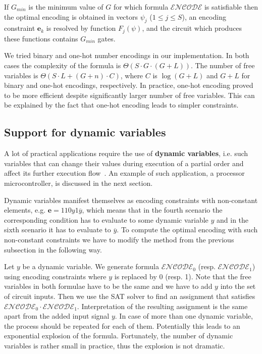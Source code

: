 If $G_{min}$ is the minimum value of $G$ for which formula $\mathcal{ENCODE}$
is satisfiable then the optimal encoding is obtained in vectors $\psi_{j}$
($1\le j\le S$), an encoding constraint $\mathbf{e}_{k}$ is resolved
by function $F_{j}(\psi)$, and the circuit which produces these functions
contains $G_{min}$ gates.

We tried binary and one-hot number encodings in our implementation.
In both cases the complexity of the formula is $\Theta(S\cdot G\cdot(G+L))$.
The number of free variables is $\Theta(S\cdot L+(G+n)\cdot C)$,
where $C$ is $\log(G+L)$ and $G+L$ for binary and one-hot encodings,
respectively. In practice, one-hot encoding proved to be more efficient
despite significantly larger number of free variables. This can be
explained by the fact that one-hot encoding leads to simpler constraints.


\subsection{Support for dynamic variables\label{sub:Support-for-dynamic}}

A lot of practical applications require the use of \textbf{dynamic
variables}, i.e. such variables that can change their values during
execution of a partial order and affect its further execution flow~\cite{2009_mokhov_phd}.
An example of such application, a processor microcontroller, is discussed
in the next section.

Dynamic variables manifest themselves as encoding constraints with
non-constant elements, e.g. $\mathbf{e}=110y1\overline{y}$, which
means that in the fourth scenario the corresponding condition has
to evaluate to some dynamic variable $y$ and in the sixth scenario
it has to evaluate to $\overline{y}$. To compute the optimal encoding
with such non-constant constraints we have to modify the method from
the previous subsection in the following way.

Let $y$ be a dynamic variable. We generate formula $\mathcal{ENCODE}_{0}$
(resp. $\mathcal{ENCODE}_{1}$) using encoding constraints where $y$
is replaced by 0 (resp. 1). Note that the free variables in both formulae
have to be the same and we have to add $y$ into the set of circuit
inputs. Then we use the SAT solver to find an assignment that satisfies
$\mathcal{ENCODE}_{0}\cdot\mathcal{ENCODE}_{1}$. Interpretation of
the resulting assignment is the same apart from the added input signal
$y$. In case of more than one dynamic variable, the process should
be repeated for each of them. Potentially this leads to an exponential
explosion of the formula. Fortunately, the number of dynamic variables
is rather small in practice, thus the explosion is not dramatic.

